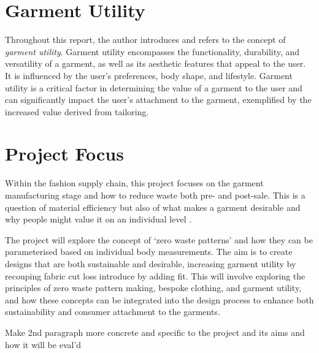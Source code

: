\section{Garment Utility}
Throughout this report, the author introduces and refers to the concept of \textit{garment utility}. Garment utility encompasses the functionality, durability, and versatility of a garment, as well as its aesthetic features that appeal to the user. It is influenced by the user's preferences, body shape, and lifestyle. Garment utility is a critical factor in determining the value of a garment to the user and can significantly impact the user's attachment to the garment, exemplified by the increased value derived from tailoring. 

\section{Project Focus}
Within the fashion supply chain, this project focuses on the garment manufacturing stage and how to reduce waste both pre- and post-sale. This is a question of material efficiency but also of what makes a garment desirable and why people might value it on an individual level \cite{black_sustainable_2013}. 

The project will explore the concept of `zero waste patterns' and how they can be parameterised based on individual body measurements. The aim is to create designs that are both sustainable and desirable, increasing garment utility by recouping fabric cut loss introduce by adding fit. This will involve exploring the principles of zero waste pattern making, bespoke clothing, and garment utility, and how these concepts can be integrated into the design process to enhance both sustainability and consumer attachment to the garments.

Make 2nd paragraph more concrete and specific to the project and its aims and how it will be eval'd

